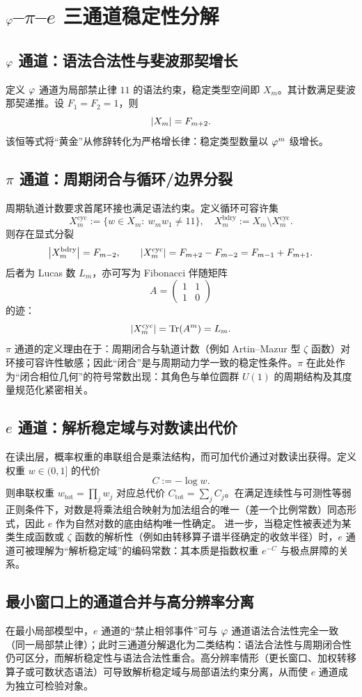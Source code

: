 \section{\texorpdfstring{$\varphi$--$\pi$--$e$}{phi-pi-e} 三通道稳定性分解}

\subsection{\texorpdfstring{$\varphi$}{phi} 通道：语法合法性与斐波那契增长}

定义 $\varphi$ 通道为局部禁止律 $11$ 的语法约束，稳定类型空间即 $X_m$。其计数满足斐波那契递推。设 $F_1=F_2=1$，则
\[
\left\lvert X_m\right\rvert=F_{m+2}.
\]
该恒等式将“黄金”从修辞转化为严格增长律：稳定类型数量以 $\varphi^m$ 级增长。

\subsection{\texorpdfstring{$\pi$}{pi} 通道：周期闭合与循环/边界分裂}

周期轨道计数要求首尾环接也满足语法约束。定义循环可容许集
\[
X_m^{\mathrm{cyc}}:=\{w\in X_m:\ w_m w_1\neq 11\},
\quad
X_m^{\mathrm{bdry}}:=X_m\setminus X_m^{\mathrm{cyc}}.
\]
则存在显式分裂
\[
\left\lvert X_m^{\mathrm{bdry}}\right\rvert=F_{m-2},\qquad
\left\lvert X_m^{\mathrm{cyc}}\right\rvert=F_{m+2}-F_{m-2}=F_{m-1}+F_{m+1}.
\]
后者为 Lucas 数 $L_m$，亦可写为 Fibonacci 伴随矩阵
\[
A=\begin{pmatrix}1&1\\1&0\end{pmatrix}
\]
的迹：
\[
\left\lvert X_m^{\mathrm{cyc}}\right\rvert=\mathrm{Tr}(A^m)=L_m.
\]
$\pi$ 通道的定义理由在于：周期闭合与轨道计数（例如 Artin--Mazur 型 $\zeta$ 函数）对环接可容许性敏感；因此“闭合”是与周期动力学一致的稳定性条件。$\pi$ 在此处作为“闭合相位几何”的符号常数出现：其角色与单位圆群 $U(1)$ 的周期结构及其度量规范化紧密相关。

\subsection{\texorpdfstring{$e$}{e} 通道：解析稳定域与对数读出代价}

在读出层，概率权重的串联组合是乘法结构，而可加代价通过对数读出获得。定义权重 $w\in(0,1]$ 的代价
\[
C:=-\log w.
\]
则串联权重 $w_{\mathrm{tot}}=\prod_j w_j$ 对应总代价 $C_{\mathrm{tot}}=\sum_j C_j$。在满足连续性与可测性等弱正则条件下，对数是将乘法组合映射为加法组合的唯一（差一个比例常数）同态形式，因此 $e$ 作为自然对数的底由结构唯一性确定。
进一步，当稳定性被表述为某类生成函数或 $\zeta$ 函数的解析性（例如由转移算子谱半径确定的收敛半径）时，$e$ 通道可被理解为“解析稳定域”的编码常数：其本质是指数权重 $e^{-C}$ 与极点屏障的关系。

\subsection{最小窗口上的通道合并与高分辨率分离}

在最小局部模型中，$e$ 通道的“禁止相邻事件”可与 $\varphi$ 通道语法合法性完全一致（同一局部禁止律）；此时三通道分解退化为二类结构：语法合法性与周期闭合性仍可区分，而解析稳定性与语法合法性重合。高分辨率情形（更长窗口、加权转移算子或可数状态语法）可导致解析稳定域与局部语法约束分离，从而使 $e$ 通道成为独立可检验对象。

